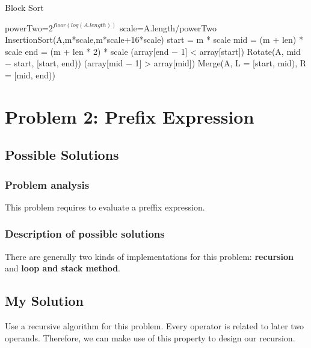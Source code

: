 \documentclass{report}
\begin{document}
\begin{algorithm}[htbp]
    \caption{Block Sort}
    \begin{algorithmic}[1]
            \State powerTwo=$2^{floor(log(A.length))}$
            \State scale=A.length/powerTwo
                \State InsertionSort(A,m*scale,m*scale+16*scale)
            \EndFor
                    \State start = m * scale
                    \State mid = (m + len) * scale
                    \State end = (m + len * 2) * scale
                    \If (array[end − 1] < array[start])
                    \State Rotate(A, mid − start, [start, end))
                    \Else
                        \If (array[mid − 1] > array[mid])
                            \State Merge(A, L = [start, mid), R = [mid, end))
                        \EndIf
                    \EndIf
                \EndFor
            \EndFor
        \EndFunction
    \end{algorithmic}
\end{algorithm}

\chapter{Problem 2: Prefix Expression}

\section{Possible Solutions}

\subsection{Problem analysis}
This problem requires to evaluate a preffix expression.

\subsection{Description of possible solutions}

There are generally two kinds of implementations for this problem:
\textbf{recursion} and \textbf{loop and stack method}.

\section{My Solution}
Use a recursive algorithm for this problem.
Every operator is related to later two operands.
Therefore, we can make use of this property to design our recursion.
\end{document}
